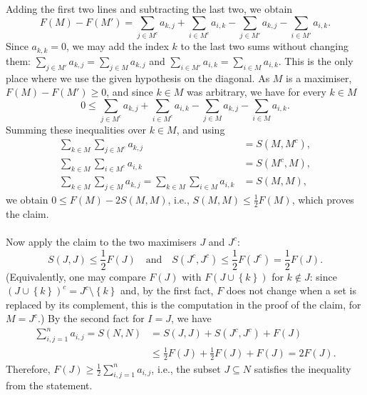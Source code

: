 \begin{solution}
\[    \]
    Adding the first two lines and subtracting the last two, we obtain
    \[
        F\left(M\right) - F\left(M'\right) = \sum_{j \in M^{c}} a_{k,j} + \sum_{i \in M^{c}} a_{i,k} - \sum_{j \in M'} a_{k,j} - \sum_{i \in M'} a_{i,k}.
    \]
    Since \( a_{k,k} = 0 \), we may add the index \( k \) to the last two sums without changing them: \( \sum_{j \in M'} a_{k,j} = \sum_{j \in M} a_{k,j} \) and \( \sum_{i \in M'} a_{i,k} = \sum_{i \in M} a_{i,k} \). This is the only place where we use the given hypothesis on the diagonal. As \( M \) is a maximiser, \( F\left(M\right) - F\left(M'\right) \geq 0 \), and since \( k \in M \) was arbitrary, we have for every \( k \in M \)
    \[
        0 \leq \sum_{j \in M^{c}} a_{k,j} + \sum_{i \in M^{c}} a_{i,k} - \sum_{j \in M} a_{k,j} - \sum_{i \in M} a_{i,k}.
    \]
    Summing these inequalities over \( k \in M \), and using
    \[
        \begin{aligned}
            \sum_{k \in M} \sum_{j \in M^{c}} a_{k,j} &= S\left(M, M^{c}\right), \\
            \sum_{k \in M} \sum_{i \in M^{c}} a_{i,k} &= S\left(M^{c}, M\right), \\
            \sum_{k \in M} \sum_{j \in M} a_{k,j} = \sum_{k \in M} \sum_{i \in M} a_{i,k} &= S\left(M, M\right),
        \end{aligned}
    \]
    we obtain \( 0 \leq F\left(M\right) - 2 S\left(M, M\right) \), i.e., \( S\left(M, M\right) \leq \frac{1}{2} F\left(M\right) \), which proves the claim.
    \\\\
    Now apply the claim to the two maximisers \( J \) and \( J^{c} \):
    \[
        S\left(J, J\right) \leq \frac{1}{2} F\left(J\right) \quad \text{and} \quad S\left(J^{c}, J^{c}\right) \leq \frac{1}{2} F\left(J^{c}\right) = \frac{1}{2} F\left(J\right).
    \]
    (Equivalently, one may compare \( F\left(J\right) \) with \( F\left(J \cup \left\{k\right\}\right) \) for \( k \notin J \): since \( \left(J \cup \left\{k\right\}\right)^{c} = J^{c} \setminus \left\{k\right\} \) and, by the first fact, \( F \) does not change when a set is replaced by its complement, this is the computation in the proof of the claim, for \( M = J^{c} \).) By the second fact for \( I = J \), we have
    \[
        \begin{aligned}
            \sum_{i,j=1}^{n} a_{i,j} = S\left(N, N\right) &= S\left(J, J\right) + S\left(J^{c}, J^{c}\right) + F\left(J\right) \\
            &\leq \frac{1}{2} F\left(J\right) + \frac{1}{2} F\left(J\right) + F\left(J\right) = 2 F\left(J\right).
        \end{aligned}
    \]
    Therefore, \( F\left(J\right) \geq \frac{1}{2} \sum_{i,j=1}^{n} a_{i,j} \), i.e., the subset \( J \subseteq N \) satisfies the inequality from the statement.


\end{solution}
